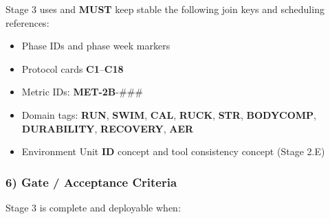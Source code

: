 \documentclass[10pt]{article}
\begin{document}
Stage 3 uses and \textbf{MUST} keep stable the following join keys and scheduling references:

\begin{itemize}
\item Phase IDs and phase week markers
\item Protocol cards \textbf{C1}–\textbf{C18}
\item Metric IDs: \textbf{MET-2B}-###
\item Domain tags: \textbf{RUN}, \textbf{SWIM}, \textbf{CAL}, \textbf{RUCK}, \textbf{STR}, \textbf{BODYCOMP}, \textbf{DURABILITY}, \textbf{RECOVERY}, \textbf{AER}
\item Environment Unit \textbf{ID} concept and tool consistency concept (Stage 2.E)
\end{itemize}

\subsubsection*{6) Gate / Acceptance Criteria}

Stage 3 is complete and deployable when:
\end{document}
